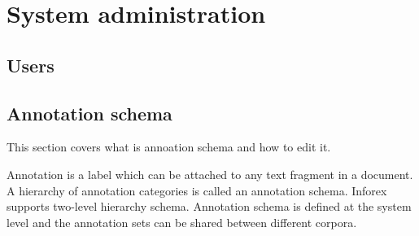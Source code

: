 \documentclass[a4paper,10pt,oneside]{scrbook}
\begin{document}
\chapter{System administration}


\section{Users}


\section{Annotation schema}

  This section covers what is annoation schema and how to edit it.

  Annotation is a label which can be attached to any text fragment in a document. A hierarchy of annotation categories is called an annotation schema. Inforex supports two-level hierarchy schema. Annotation schema is defined at the system level and the annotation sets can be shared between different corpora.
\end{document}
